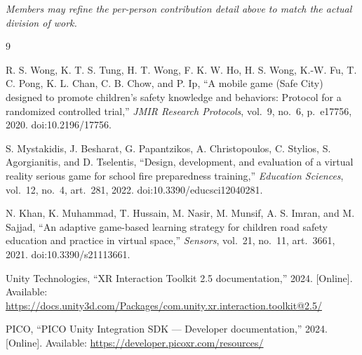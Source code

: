 \documentclass[a4paper,12pt]{article}
\begin{document}
\textit{\small Members may refine the per-person contribution detail above to match the actual division of work.}

\newpage
\begin{thebibliography}{9}

R. S. Wong, K. T. S. Tung, H. T. Wong, F. K. W. Ho, H. S. Wong, K.-W. Fu, T. C. Pong, K. L. Chan, C. B. Chow, and P. Ip,
``A mobile game (Safe City) designed to promote children's safety knowledge and behaviors: Protocol for a randomized controlled trial,''
\emph{JMIR Research Protocols}, vol.~9, no.~6, p.~e17756, 2020. doi:10.2196/17756.

S. Mystakidis, J. Besharat, G. Papantzikos, A. Christopoulos, C. Stylios, S. Agorgianitis, and D. Tselentis,
``Design, development, and evaluation of a virtual reality serious game for school fire preparedness training,''
\emph{Education Sciences}, vol.~12, no.~4, art.~281, 2022. doi:10.3390/educsci12040281.

N. Khan, K. Muhammad, T. Hussain, M. Nasir, M. Munsif, A. S. Imran, and M. Sajjad,
``An adaptive game-based learning strategy for children road safety education and practice in virtual space,''
\emph{Sensors}, vol.~21, no.~11, art.~3661, 2021. doi:10.3390/s21113661.

Unity Technologies,
``XR Interaction Toolkit 2.5 documentation,'' 2024. [Online]. Available:
\url{https://docs.unity3d.com/Packages/com.unity.xr.interaction.toolkit@2.5/}

PICO,
``PICO Unity Integration SDK --- Developer documentation,'' 2024. [Online]. Available:
\url{https://developer.picoxr.com/resources/}

\end{thebibliography}
\end{document}
